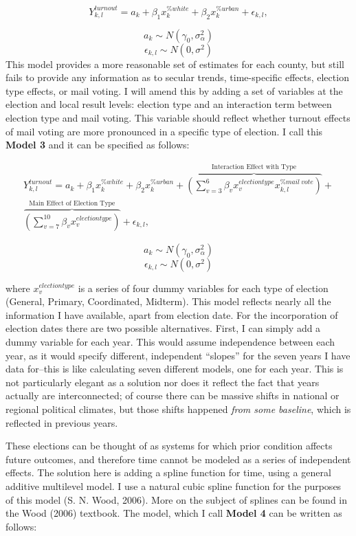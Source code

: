 \documentclass[12pt,twoside]{reedthesis}
\begin{document}
  \begin{equation} \tag{Model 2}
  Y^{turnout}_{k,l} = a_{k} + \beta_{1}x_k^{\%white} + \beta_{2}x_k^{\%urban} + \epsilon_{k,l},
  \end{equation}
  
  \[a_{k} \sim N (\gamma_0, \sigma_{\alpha}^2)\]
  \[\epsilon_{k,l} \sim N(0, \sigma^2)\] This model provides a more
  reasonable set of estimates for each county, but still fails to provide
  any information as to secular trends, time-specific effects, election
  type effects, or mail voting. I will amend this by adding a set of
  variables at the election and local result levels: election type and an
  interaction term between election type and mail voting. This variable
  should reflect whether turnout effects of mail voting are more
  pronounced in a specific type of election. I call this \textbf{Model 3}
  and it can be specified as follows:
  
  \begin{multline} \tag{Model 3}
  Y^{turnout}_{k,l} = a_{k} + \beta_{1}x_k^{\% white} + \beta_{2}x_k^{\% urban} + \overbrace{(\sum_{v=3}^{6}\beta_{v}x_{v}^{election type} x_{k,l}^{\% mail~vote})}^\text{Interaction Effect with Type} + \\ \overbrace{(\sum_{v=7}^{10}\beta_{v}x_{v}^{election type})}^\text{Main Effect of Election Type} + \epsilon_{k,l},
  \end{multline}
  
  \[a_{k} \sim N(\gamma_0, \sigma_{\alpha}^2)\]
  \[\epsilon_{k,l} \sim N(0, \sigma^2)\]
  
  where \(x_{v}^{election type}\) is a series of four dummy variables for
  each type of election (General, Primary, Coordinated, Midterm). This
  model reflects nearly all the information I have available, apart from
  election date. For the incorporation of election dates there are two
  possible alternatives. First, I can simply add a dummy variable for each
  year. This would assume independence between each year, as it would
  specify different, independent ``slopes'' for the seven years I have
  data for--this is like calculating seven different models, one for each
  year. This is not particularly elegant as a solution nor does it reflect
  the fact that years actually are interconnected; of course there can be
  massive shifts in national or regional political climates, but those
  shifts happened \emph{from some baseline}, which is reflected in
  previous years.
  
  These elections can be thought of as systems for which prior condition
  affects future outcomes, and therefore time cannot be modeled as a
  series of independent effects. The solution here is adding a spline
  function for time, using a general additive multilevel model. I use a
  natural cubic spline function for the purposes of this model (S. N.
  Wood, 2006). More on the subject of splines can be found in the Wood
  (2006) textbook. The model, which I call \textbf{Model 4} can be written
  as follows:
  
\end{document}

